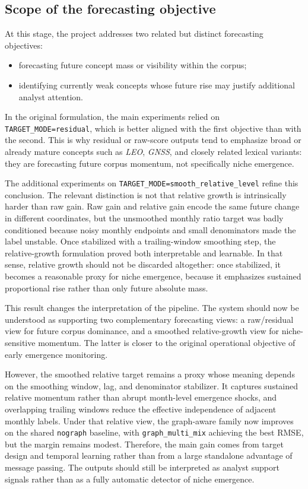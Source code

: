 \documentclass{article}
\begin{document}
\subsection{Scope of the forecasting objective}
At this stage, the project addresses two related but distinct forecasting objectives:
\begin{itemize}
  \item forecasting future concept mass or visibility within the corpus;
  \item identifying currently weak concepts whose future rise may justify additional analyst attention.
\end{itemize}

In the original formulation, the main experiments relied on \texttt{TARGET\_MODE=residual}, which is better aligned with the first objective than with the second. This is why residual or raw-score outputs tend to emphasize broad or already mature concepts such as \textit{LEO}, \textit{GNSS}, and closely related lexical variants: they are forecasting future corpus momentum, not specifically niche emergence.

The additional experiments on \texttt{TARGET\_MODE=smooth\_relative\_level} refine this conclusion. The relevant distinction is not that relative growth is intrinsically harder than raw gain. Raw gain and relative gain encode the same future change in different coordinates, but the unsmoothed monthly ratio target was badly conditioned because noisy monthly endpoints and small denominators made the label unstable. Once stabilized with a trailing-window smoothing step, the relative-growth formulation proved both interpretable and learnable. In that sense, relative growth should not be discarded altogether: once stabilized, it becomes a reasonable proxy for niche emergence, because it emphasizes sustained proportional rise rather than only future absolute mass.

This result changes the interpretation of the pipeline. The system should now be understood as supporting two complementary forecasting views: a raw/residual view for future corpus dominance, and a smoothed relative-growth view for niche-sensitive momentum. The latter is closer to the original operational objective of early emergence monitoring.

However, the smoothed relative target remains a proxy whose meaning depends on the smoothing window, lag, and denominator stabilizer. It captures sustained relative momentum rather than abrupt month-level emergence shocks, and overlapping trailing windows reduce the effective independence of adjacent monthly labels. Under that relative view, the graph-aware family now improves on the shared \texttt{nograph} baseline, with \texttt{graph\_multi\_mix} achieving the best RMSE, but the margin remains modest. Therefore, the main gain comes from target design and temporal learning rather than from a large standalone advantage of message passing. The outputs should still be interpreted as analyst support signals rather than as a fully automatic detector of niche emergence.
\end{document}
